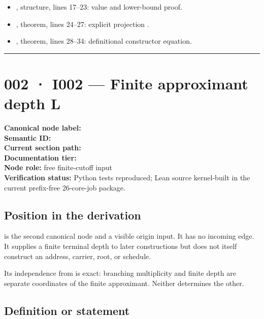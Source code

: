 \begin{itemize}
\tightlist
\item
  \texttt{\protect{}}, structure, lines 17--23: value and
  lower-bound proof.
\item
  \texttt{\protect{}}, theorem, lines 24--27: explicit projection
  \texttt{\protect{}}.
\item
  \texttt{\protect{}}, theorem, lines 28--34: definitional constructor
  equation.
\end{itemize}

\begin{center}\rule{0.5\linewidth}{0.5pt}\end{center}

\section{002 · I002 --- Finite approximant depth
L}\label{i002-finite-approximant-depth-l}

\textbf{Canonical node label:} \texttt{\protect{}}\\
\textbf{Semantic ID:} \texttt{\protect{}}\\
\textbf{Current section path:} \texttt{\protect{}}\\
\textbf{Documentation tier:} \texttt{\protect{}}\\
\textbf{Node role:} free finite-cutoff input\\
\textbf{Verification status:} Python tests reproduced; Lean source
kernel-built in the current prefix-free 26-core-job package.

\subsection{Position in the
derivation}\label{position-in-the-derivation-1}

\texttt{\protect{}} is the second canonical node and a visible origin input.
It has no incoming edge. It supplies a finite terminal depth to later
constructions but does not itself construct an address, carrier, root,
or schedule.

Its independence from \texttt{\protect{}} is exact: branching multiplicity and
finite depth are separate coordinates of the finite approximant. Neither
determines the other.

\subsection{Definition or statement}\label{definition-or-statement-1}

